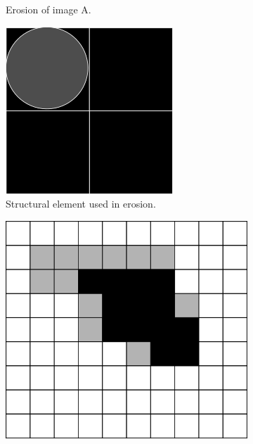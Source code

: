 \documentclass[
  digital,     %
  oneside,     %
  nosansbold,  %
  nocolorbold, %
  lof,         %
  lot,         %
]{fithesis4}
\begin{document}
\begin{figure}
\begin{subfigure}[t]{0.4\textwidth}
        \caption{Erosion of image A.}
        \label{fig:opening_erosion}
    \end{subfigure}
    \begin{subfigure}[t]{0.2\textwidth}
        \centering
        \includegraphics[width=\textwidth]{resources/inkscape/opening_erosion_se.png}
        \caption{Structural element used in erosion.}
        \label{fig:opening_erosion_se}
    \end{subfigure}
    \begin{subfigure}[t]{0.4\textwidth}
        \centering
        \includegraphics[width=\textwidth]{resources/inkscape/opening_dilation.png}

\end{subfigure}
\end{figure}
\end{document}
